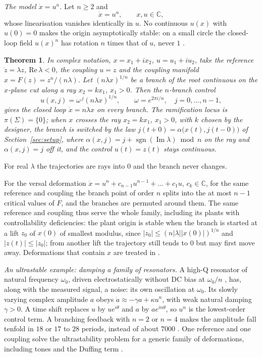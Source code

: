 \documentclass[11pt,reqno]{amsart}
\theoremstyle{plain}
\newtheorem*{theorem}{Theorem}
\theoremstyle{remark}
\theoremstyle{definition}
\newcommand{\C}{\mathbb{C}}
\newcommand{\Sig}{\Sigma}
\begin{document}
\emph{The model $\dot x=u^{n}$.} Let $n\ge2$ and
\begin{equation}\label{eq:model}
  \dot x=u^{n},\qquad x,u\in\C ,
\end{equation}
whose linearisation vanishes identically in $u$. No continuous $u(x)$ with $u(0)=0$ makes the origin
asymptotically stable: on a small circle the closed-loop field $u(x)^{n}$ has rotation $n$ times that of $u$,
never $1$ \cite[Prop.~4.1]{Shosh1990}.

\begin{theorem}
In complex notation, $x=x_1+ix_2$, $u=u_1+iu_2$, take the reference $\dot z=\lambda z$, $\mathrm{Re}\,\lambda<0$, the
coupling $u=z$ and the coupling manifold $x=F(z)=z^{n}/(n\lambda)$. Let $(n\lambda x)^{1/n}$ be a branch of the root
continuous on the $x$-plane cut along a ray $x_2=kx_1$, $x_1>0$. Then the $n$-branch control
\[
  u(x,j)=\omega^{\,j}(n\lambda x)^{1/n},\qquad \omega=e^{2\pi i/n},\quad j=0,\dots,n-1,
\]
gives the closed loop $\dot x=n\lambda x$ on every branch. The ramification locus is $\pi(\Sig)=\{0\}$; when $x$
crosses the ray $x_2=kx_1$, $x_1>0$, with $k$ chosen by the designer, the branch is switched by the law $j(t+0)=\alpha\bigl(x(t),j(t-0)\bigr)$ of Section~\ref{sec:setup}, where $\alpha(x,j)=j+\operatorname{sgn}(\operatorname{Im}\lambda)\bmod n$ on the ray and $\alpha(x,j)=j$ off it, and the control
$u(t)=z(t)$ stays continuous.
\end{theorem}

For real $\lambda$ the trajectories are rays into $0$ and the branch never changes.

For the versal deformation $\dot x=u^{n}+c_{n-1}u^{n-1}+\dots+c_1u$, $c_k\in\C$, for the same reference and coupling
the branch point of order $n$ splits into the at most $n-1$ critical values of $F$, and the branches are permuted around them. The same reference
and coupling thus serve the whole family, including its plants with controllability deficiencies: the plant origin is stable when the branch is started at a lift $z_0$ of $x(0)$ of smallest modulus, since
$|z_0|\le(n|\lambda||x(0)|)^{1/n}$ and $|z(t)|\le|z_0|$;
from another lift the trajectory still tends to $0$ but may first move away. Deformations that contain $x$ are treated in \cite[\S3.4]{Companion}.

\emph{An ultrastable example: damping a family of resonators.} A high-Q resonator of natural frequency $\omega_0$, driven electrostatically without DC bias at $\omega_0/n$ \cite{MalufWilliams2004,KassieLeviElata2020}, has, along with the measured signal, a noise: its own oscillation at $\omega_0$. Its slowly varying complex amplitude $a$ obeys $\dot a\approx-\gamma a+\kappa u^{n}$, with weak natural damping $\gamma>0$. A time shift replaces $u$ by $ue^{i\theta}$ and $a$ by $ae^{in\theta}$, so $u^{n}$ is the lowest-order control term. A branching feedback with $n=2$ or $n=4$ makes the amplitude fall tenfold in $18$ or $17$ to $28$ periods, instead of about $7000$ \cite[\S3.4]{Companion}. One reference and one coupling solve the ultrastability problem for a generic family of deformations, including tones and the Duffing term \cite[\S3.4]{Companion}.
\end{document}
